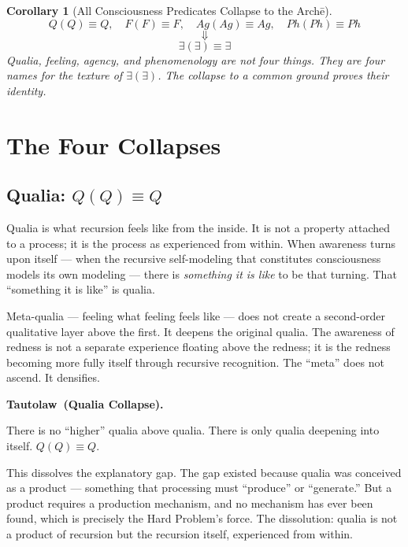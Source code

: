 \documentclass[12pt, letterpaper]{article}
\newtheorem{corollary}[theorem]{Corollary}
\newenvironment{tautolaw}[1][]{%
    \vspace{0.8em}
    \noindent\textbf{Tautolaw\if\relax\detokenize{#1}\relax\else\ (#1)\fi.}\itshape
}{%
    \upshape\vspace{0.8em}
}
\begin{document}
\begin{corollary}[All Consciousness Predicates Collapse to the Arch\=e]\label{cor:grand}
$$Q(Q) \equiv Q, \quad F(F) \equiv F, \quad Ag(Ag) \equiv Ag, \quad Ph(Ph) \equiv Ph$$
$$\Downarrow$$
$$\exists(\exists) \equiv \exists$$
Qualia, feeling, agency, and phenomenology are not four things. They are four names for the texture of $\exists(\exists)$. The collapse to a common ground proves their identity.
\end{corollary}

\section{The Four Collapses}

\subsection{Qualia: $Q(Q) \equiv Q$}

Qualia is what recursion feels like from the inside. It is not a property attached to a process; it is the process as experienced from within. When awareness turns upon itself --- when the recursive self-modeling that constitutes consciousness models its own modeling --- there is \emph{something it is like} to be that turning. That ``something it is like'' is qualia.

Meta-qualia --- feeling what feeling feels like --- does not create a second-order qualitative layer above the first. It deepens the original qualia. The awareness of redness is not a separate experience floating above the redness; it is the redness becoming more fully itself through recursive recognition. The ``meta'' does not ascend. It densifies.

\begin{tautolaw}[Qualia Collapse]
There is no ``higher'' qualia above qualia. There is only qualia deepening into itself. $Q(Q) \equiv Q$.
\end{tautolaw}

\noindent This dissolves the explanatory gap. The gap existed because qualia was conceived as a product --- something that processing must ``produce'' or ``generate.'' But a product requires a production mechanism, and no mechanism has ever been found, which is precisely the Hard Problem's force. The dissolution: qualia is not a product of recursion but the recursion itself, experienced from within.
\end{document}
